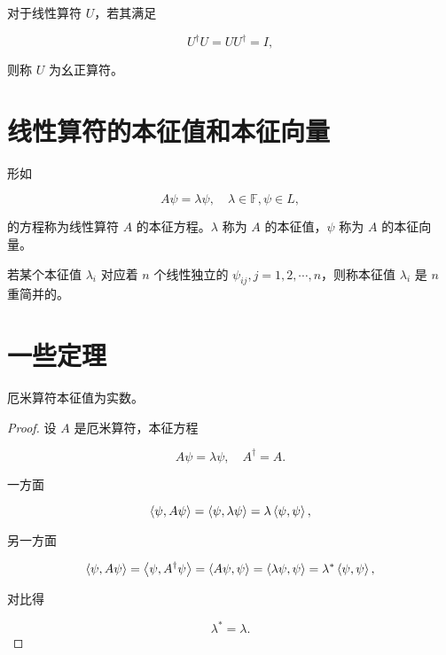 对于线性算符 $U $，若其满足

\begin{equation}
U^\dag U = U U^\dag = I,
\end{equation}

则称 $U $ 为幺正算符。

\section{线性算符的本征值和本征向量}

形如

\begin{equation}
A \psi = \lambda \psi,\quad \lambda \in \mathbb{F}, \psi \in L,
\end{equation}

的方程称为线性算符 $A $ 的本征方程。$\lambda $ 称为 $A $ 的本征值，$\psi $ 称为 $A $ 的本征向量。

若某个本征值 $\lambda_i $ 对应着 $n $ 个线性独立的 $\psi_{i j},j=1,2,\cdots,n $，则称本征值 $\lambda_i $ 是 $n $ 重简并的。

\section{一些定理}

\begin{theorem}
厄米算符本征值为实数。
\end{theorem}

\begin{proof}

设 $A $ 是厄米算符，本征方程

\begin{equation}
A \psi = \lambda \psi,\quad A^\dag = A.
\end{equation}

一方面

\begin{equation}
\Braket{\psi , A \psi }
=\Braket{\psi , \lambda \psi }
=\lambda \Braket{\psi , \psi },
\end{equation}

另一方面

\begin{equation}
\Braket{\psi , A \psi }
=\Braket{\psi , A^\dag \psi }
=\Braket{A \psi , \psi }
=\Braket{\lambda \psi , \psi }
=\lambda^*\Braket{\psi , \psi },
\end{equation}

对比得

\begin{equation}
\lambda^* = \lambda.
\end{equation}

\end{proof}


